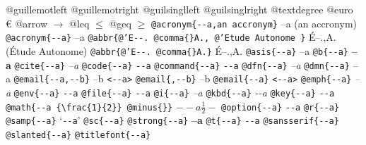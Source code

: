 \documentclass{book}
\begin{document}
@guillemotleft \guillemotleft{}
@guillemotright \guillemotright{}
@guilsinglleft \guilsinglleft{}
@guilsinglright \guilsinglright{}
@textdegree \textdegree{}
@euro \euro{}
@arrow $\rightarrow{}$
@leq $\leq{}$
@geq $\geq{}$
\texttt{@acronym\{{-}{-}a,an accronym\}} --a (an accronym)
\texttt{@acronym\{{-}{-}a\}} --a
\texttt{@abbr\{@'E{-}{-}. @comma\{\}A., @'Etude Autonome \}} \'{E}--.\@ ,A.\@ (\'{E}tude Autonome)
\texttt{@abbr\{@'E{-}{-}. @comma\{\}A.\}} \'{E}--.\@ ,A.\@
\texttt{@asis\{{-}{-}a\}} --a
\texttt{@b\{{-}{-}a\}} \textbf{--a}
\texttt{@cite\{{-}{-}a\}} \textit{--a}
\texttt{@code\{{-}{-}a\}} \texttt{{-}{-}a}
\texttt{@command\{{-}{-}a\}} \texttt{{-}{-}a}
\texttt{@dfn\{{-}{-}a\}} \emph{--a}
\texttt{@dmn\{{-}{-}a\}} --a
\texttt{@email\{{-}{-}a,{-}{-}b\}} --b \texttt{<{-}{-}a>}
\texttt{@email\{,{-}{-}b\}} --b
\texttt{@email\{{-}{-}a\}} \texttt{<{-}{-}a>}
\texttt{@emph\{{-}{-}a\}} \emph{--a}
\texttt{@env\{{-}{-}a\}} \texttt{{-}{-}a}
\texttt{@file\{{-}{-}a\}} \texttt{{-}{-}a}
\texttt{@i\{{-}{-}a\}} \textit{--a}
\texttt{@kbd\{{-}{-}a\}} {\ttfamily\textsl{{-}{-}a}}
\texttt{@key\{{-}{-}a\}} \texttt{{-}{-}a}
\texttt{@math\{{-}{-}a \{\textbackslash{}frac\{1\}\{2\}\} @minus\{\}\}} $--a {\frac{1}{2}} -$
\texttt{@option\{{-}{-}a\}} \texttt{{-}{-}a}
\texttt{@r\{{-}{-}a\}} 
\texttt{@samp\{{-}{-}a\}} `\texttt{{-}{-}a}'
\texttt{@sc\{{-}{-}a\}} 
\texttt{@strong\{{-}{-}a\}} \textbf{--a}
\texttt{@t\{{-}{-}a\}} \texttt{{-}{-}a}
\texttt{@sansserif\{{-}{-}a\}} 
\texttt{@slanted\{{-}{-}a\}} 
\texttt{@titlefont\{{-}{-}a\}} 
\end{document}
